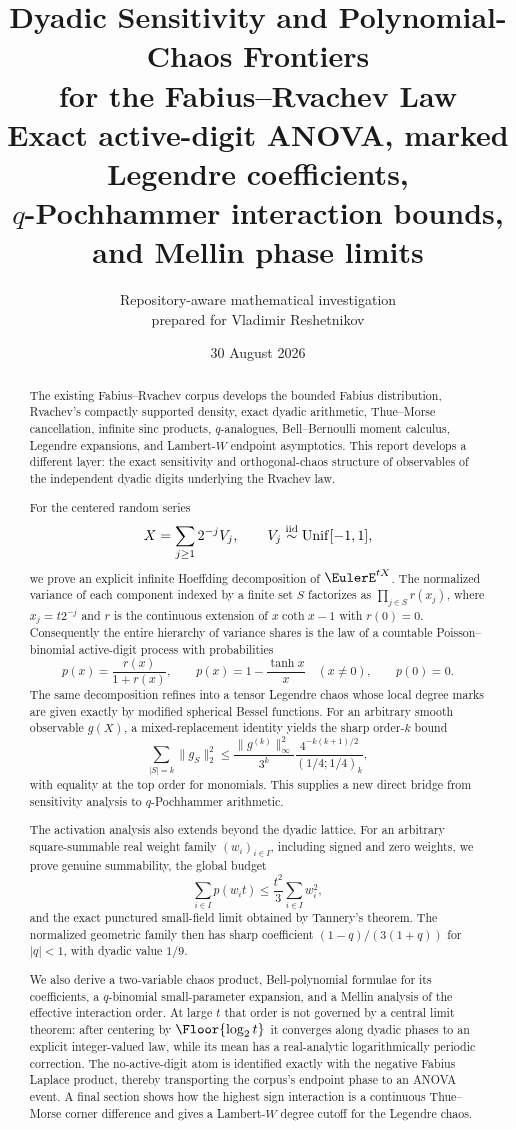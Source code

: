 \documentclass[11pt,oneside]{article}
\title{\bfseries Dyadic Sensitivity and Polynomial-Chaos Frontiers\\[0.3em]
\Large for the Fabius--Rvachev Law\\[0.55em]
\large Exact active-digit ANOVA, marked Legendre coefficients,\\
$q$-Pochhammer interaction bounds, and Mellin phase limits}
\author{Repository-aware mathematical investigation\\
\small prepared for Vladimir Reshetnikov}
\date{30 August 2026}
\theoremstyle{definition}
\theoremstyle{remark}
\begin{document}
\maketitle

\begin{abstract}
The existing Fabius--Rvachev corpus develops the bounded Fabius distribution,
Rvachev's compactly supported density, exact dyadic arithmetic, Thue--Morse
cancellation, infinite sinc products, $q$-analogues, Bell--Bernoulli moment
calculus, Legendre expansions, and Lambert-$W$ endpoint asymptotics.  This
report develops a different layer: the exact sensitivity and orthogonal-chaos
structure of observables of the independent dyadic digits underlying the
Rvachev law.

For the centered random series
\[
 X=\sum_{j\ge1}2^{-j}V_j,\qquad V_j\stackrel{\rm iid}{\sim}
 \operatorname{Unif}[-1,1],
\]
we prove an explicit infinite Hoeffding decomposition of $\EulerE^{tX}$.  The
normalized variance of each component indexed by a finite set $S$ factorizes
as $\prod_{j\in S}r(x_j)$, where $x_j=t2^{-j}$ and $r$ is the continuous
extension of $x\coth x-1$ with $r(0)=0$.  Consequently the
entire hierarchy of variance shares is the law of a countable
Poisson--binomial active-digit process with probabilities
\[
 p(x)=\frac{r(x)}{1+r(x)},
 \qquad p(x)=1-\frac{\tanh x}{x}\quad(x\ne0),
 \qquad p(0)=0.
\]
The same decomposition refines into a tensor Legendre chaos whose local degree
marks are given exactly by modified spherical Bessel functions.  For an
arbitrary smooth observable $g(X)$, a mixed-replacement identity yields the
sharp order-$k$ bound
\[
 \sum_{|S|=k}\|g_S\|_2^2
 \le \frac{\|g^{(k)}\|_\infty^2}{3^k}
 \frac{4^{-k(k+1)/2}}{(1/4;1/4)_k},
\]
with equality at the top order for monomials.  This supplies a new direct
bridge from sensitivity analysis to $q$-Pochhammer arithmetic.

The activation analysis also extends beyond the dyadic lattice.  For an
arbitrary square-summable real weight family $(w_i)_{i\in I}$, including
signed and zero weights, we prove genuine summability, the global budget
\[
 \sum_{i\in I}p(w_it)\le \frac{t^2}{3}\sum_{i\in I}w_i^2,
\]
and the exact punctured small-field limit obtained by Tannery's theorem.  The
normalized geometric family then has sharp coefficient
$(1-q)/(3(1+q))$ for $|q|<1$, with dyadic value $1/9$.

We also derive a two-variable chaos product, Bell-polynomial formulae for its
coefficients, a $q$-binomial small-parameter expansion, and a Mellin analysis
of the effective interaction order.  At large $t$ that order is not governed
by a central limit theorem: after centering by $\Floor{\log_2t}$ it
converges along dyadic phases to an explicit integer-valued law, while its mean
has a real-analytic logarithmically periodic correction.  The no-active-digit
atom is identified exactly with the negative Fabius Laplace product, thereby
transporting the corpus's endpoint phase to an ANOVA event.  A final section
shows how the highest sign interaction is a continuous Thue--Morse corner
difference and gives a Lambert-$W$ degree cutoff for the Legendre chaos.


\end{abstract}
\end{document}
